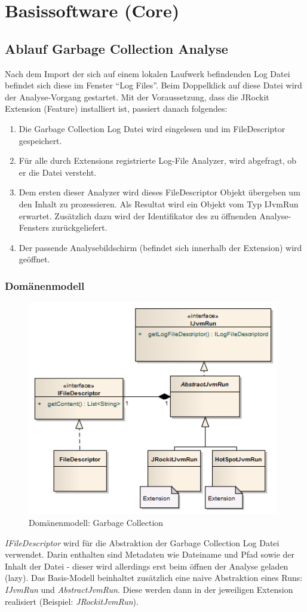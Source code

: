 \section{Basissoftware (Core)}
\subsection{Ablauf Garbage Collection Analyse}
Nach dem Import der sich auf einem lokalen Laufwerk befindenden Log Datei befindet sich diese im Fenster ``Log Files''. Beim Doppelklick auf diese Datei wird der Analyse-Vorgang gestartet. Mit der Voraussetzung, dass die JRockit Extension (Feature) installiert ist, passiert danach folgendes:
\begin{enumerate}
	\item Die Garbage Collection Log Datei wird eingelesen und im FileDescriptor gespeichert.
	\item Für alle durch Extensions registrierte Log-File Analyzer, wird abgefragt, ob er die Datei versteht.
	\item Dem ersten dieser Analyzer wird dieses FileDescriptor Objekt übergeben um den Inhalt zu prozessieren. Als Resultat wird ein Objekt vom Typ IJvmRun erwartet. Zusätzlich dazu wird der Identifikator des zu öffnenden Analyse-Fensters zurückgeliefert.
	\item Der passende Analysebildschirm (befindet sich innerhalb der Extension) wird geöffnet.
\end{enumerate}
\subsubsection{Domänenmodell}
 \begin{figure}[H]
  	\centering
        	\caption{Domänenmodell: Garbage Collection}
    	\includegraphics[width=11cm]{images/core_domain}
\end{figure}
\textit{IFileDescriptor} wird für die Abstraktion der Garbage Collection Log Datei verwendet. Darin enthalten sind Metadaten wie Dateiname und Pfad sowie der Inhalt der Datei - dieser wird allerdings erst beim öffnen der Analyse geladen (lazy). Das Basis-Modell beinhaltet zusätzlich eine naive Abstraktion eines Runs: \textit{IJvmRun} und \textit{AbstractJvmRun}. Diese werden dann in der jeweiligen Extension realisiert (Beispiel: \textit{JRockitJvmRun}). 

